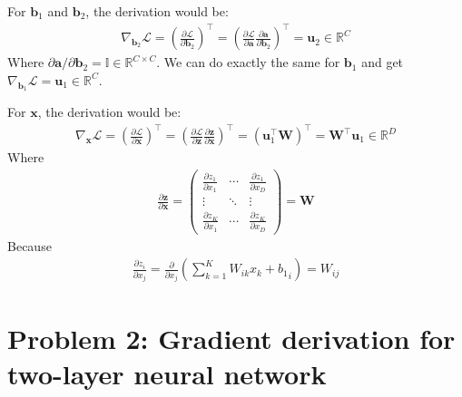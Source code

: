 \documentclass[11pt, a4paper, oneside]{memoir}
\begin{document}
For $\boldsymbol{b}_1$ and $\boldsymbol{b}_2$, the derivation would be:
\begin{align*}
    \nabla_{\boldsymbol{b}_2} \mathcal{L} = \left( \frac{\partial \mathcal{L}}{\partial \boldsymbol{b}_2} \right)^\top
    = \left( \frac{\partial \mathcal{L}}{\partial \boldsymbol{a}} \frac{\partial \boldsymbol{a}}{\partial \boldsymbol{b}_2} \right)^\top
    = \boldsymbol{u}_2 \in \mathbb{R}^{C}
\end{align*}
Where $\partial \boldsymbol{a} / \partial \boldsymbol{b}_2 = \mathbb{I} \in \mathbb{R}^{C \times C}$.
We can do exactly the same for $\boldsymbol{b}_1$ and get $\nabla_{\boldsymbol{b}_1} \mathcal{L} = \boldsymbol{u}_1 \in \mathbb{R}^{C}$.

For $\boldsymbol{x}$, the derivation would be:
\begin{align*}
    \nabla_{\boldsymbol{x}} \mathcal{L} = \left( \frac{\partial \mathcal{L}}{\partial \boldsymbol{x}} \right)^\top
    = \left( \frac{\partial \mathcal{L}}{\partial \boldsymbol{z}} \frac{\partial \boldsymbol{z}}{\partial \boldsymbol{x}} \right)^\top
    = \left( \boldsymbol{u}_1^\top \mathbf{W} \right)^\top
    = \mathbf{W}^\top \boldsymbol{u}_1 \in \mathbb{R}^{D}
\end{align*}
Where
\begin{align*}
    \frac{\partial \boldsymbol{z}}{\partial \boldsymbol{x}} =
    \begin{pmatrix}
        \frac{\partial z_1}{\partial x_1} & \cdots & \frac{\partial z_1}{\partial x_D} \\
        \vdots                            & \ddots & \vdots                            \\
        \frac{\partial z_K}{\partial x_1} & \cdots & \frac{\partial z_K}{\partial x_D}
    \end{pmatrix} = \mathbf{W}
\end{align*}
Because
\begin{align*}
    \frac{\partial z_i}{\partial x_j} = \frac{\partial}{\partial x_j} (\sum_{k=1}^{K} W_{ik} x_k + {b_1}_i)= W_{ij}
\end{align*}

\chapter{Problem 2: Gradient derivation for two-layer neural network}
\end{document}
